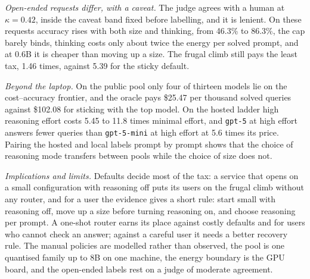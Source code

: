\emph{Open-ended requests differ, with a caveat.} The judge agrees with a
human at $\kappa = 0.42$, inside the caveat band fixed before labelling, and
it is lenient. On these requests accuracy rises with both size and
thinking, from 46.3\% to 86.3\%, the cap barely binds, thinking costs only
about twice the energy per solved prompt, and at 0.6B it is cheaper than
moving up a size. The frugal climb still pays the least tax, 1.46 times,
against 5.39 for the sticky default.

\emph{Beyond the laptop.} On the public pool only four of thirteen models lie
on the cost--accuracy frontier, and the oracle pays \$25.47 per thousand
solved queries against \$102.08 for sticking with the top model. On the
hosted ladder high reasoning effort costs 5.45 to 11.8 times minimal effort,
and \texttt{gpt-5} at high effort answers fewer queries than
\texttt{gpt-5-mini} at high effort at 5.6 times its price. Pairing the hosted
and local labels prompt by prompt shows that the choice of reasoning mode
transfers between pools while the choice of size does not.

\emph{Implications and limits.} Defaults decide most of the tax: a service
that opens on a small configuration with reasoning off puts its users on the
frugal climb without any router, and for a user the evidence gives a short
rule: start small with reasoning off, move up a size before turning reasoning
on, and choose reasoning per prompt. A one-shot router earns its place against
costly defaults and for users who cannot check an answer; against a careful
user it needs a better recovery rule. The manual policies are modelled rather
than observed, the pool is one quantised family up to 8B on one machine, the
energy boundary is the GPU board, and the open-ended labels rest on a judge
of moderate agreement.
